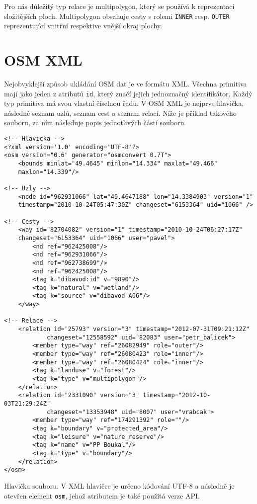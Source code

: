 Pro nás důležitý typ relace je multipolygon, který se používá k reprezentaci
složitějších ploch. Multipolygon obsahuje cesty s rolemi \verb|INNER| resp.
\verb|OUTER| reprezentující vnitřní respektive vnější okraj plochy.

\section{OSM XML}
Nejobvyklejší způsob ukládání OSM dat je ve formátu XML. Všechna primitiva mají
jako jeden z atributů \verb|id|, který značí jejich jednoznačný identifikátor.
Každý typ primitiva má svou vlastní číselnou řadu. V OSM XML\cite{osmxml} je
nejprve hlavička, následně seznam uzlů, seznam cest a seznam relací. Níže je
příklad takového souboru, za ním následuje popis jednotlivých částí souboru.

\begin{verbatim}
<!-- Hlavicka -->
<?xml version='1.0' encoding='UTF-8'?>
<osm version="0.6" generator="osmconvert 0.7T">
	<bounds minlat="49.4645" minlon="14.334" maxlat="49.466" 
	maxlon="14.339"/>

<!-- Uzly -->
	<node id="962931066" lat="49.4647188" lon="14.3384903" version="1" 
	timestamp="2010-10-24T05:47:30Z" changeset="6153364" uid="1066" />

<!-- Cesty -->
	<way id="82704082" version="1" timestamp="2010-10-24T06:27:17Z" 
	changeset="6153364" uid="1066" user="pavel">
	    <nd ref="962425008"/>
	    <nd ref="962931066"/>
	    <nd ref="962738699"/>
	    <nd ref="962425008"/>
	    <tag k="dibavod:id" v="9890"/>
	    <tag k="natural" v="wetland"/>
	    <tag k="source" v="dibavod A06"/>
	</way>

<!-- Relace -->
	<relation id="25793" version="3" timestamp="2012-07-31T09:21:12Z" 
			changeset="12558592" uid="82083" user="petr_balicek">
	    <member type="way" ref="26082949" role="outer"/>
	    <member type="way" ref="26080423" role="inner"/>
	    <member type="way" ref="26080424" role="inner"/>
	    <tag k="landuse" v="forest"/>
	    <tag k="type" v="multipolygon"/>
	</relation>
	<relation id="2331090" version="3" timestamp="2012-10-03T21:29:24Z"
			changeset="13353948" uid="8007" user="vrabcak">
	    <member type="way" ref="174291392" role=""/>
	    <tag k="boundary" v="protected_area"/>
	    <tag k="leisure" v="nature_reserve"/>
	    <tag k="name" v="PP Boukal"/>
	    <tag k="type" v="boundary"/>
	</relation>
</osm>
\end{verbatim}

{\tuc Hlavička souboru.} V XML hlavičce je určeno kódování UTF-8 a následně je
otevřen element \verb|osm|, jehož atributem je také použitá verze API. 


